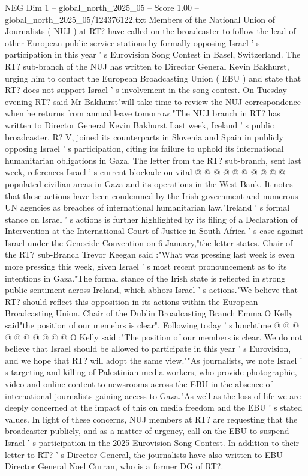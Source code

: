 \begin{textsample}{NEG Dim 1 – global\_north\_2025\_05 – Score 1.00 – global\_north\_2025\_05/124376122.txt}  \label{ex:f1_neg_085}
Members of the National Union of Journalists ( NUJ ) at RT? have called on the broadcaster to follow the lead of other European public service stations by formally opposing Israel ' s participation in this year ' s Eurovision Song Contest in Basel, Switzerland.
The RT? sub-branch of the NUJ has written to Director General Kevin Bakhurst, urging him to contact the European Broadcasting Union ( EBU ) and state that RT? does not support Israel ' s involvement in the song contest.
On Tuesday evening RT? said Mr Bakhurst"will take time to review the NUJ correspondence when he returns from annual leave tomorrow."The NUJ branch in RT? has written to Director General Kevin Bakhurst Last week, Iceland ' s public broadcaster, R?
V, joined its counterparts in Slovenia and Spain in publicly opposing Israel ' s participation, citing its failure to uphold its international humanitarian obligations in Gaza.
The letter from the RT? sub-branch, sent last week, references Israel ' s current blockade on vital @ @ @ @ @ @ @ @ @ @ populated civilian areas in Gaza and its operations in the West Bank.
It notes that these actions have been condemned by the Irish government and numerous UN agencies as breaches of international humanitarian law."Ireland ' s formal stance on Israel ' s actions is further highlighted by its filing of a Declaration of Intervention at the International Court of Justice in South Africa ' s case against Israel under the Genocide Convention on 6 January,"the letter states.
Chair of the RT? sub-Branch Trevor Keegan said :"What was pressing last week is even more pressing this week, given Israel ' s most recent pronouncement as to its intentions in Gaza."The formal stance of the Irish state is reflected in strong public sentiment across Ireland, which abhors Israel ' s actions."We believe that RT? should reflect this opposition in its actions within the European Broadcasting Union.
Chair of the Dublin Broadcasting Branch Emma O Kelly said"the position of our memebrs is clear".
Following today ' s lunchtime @ @ @ @ @ @ @ @ @ @ O Kelly said :"The position of our members is clear.
We do not believe that Israel should be allowed to participate in this year ' s Eurovision, and we hope that RT? will adopt the same view.""As journalists, we note Israel ' s targeting and killing of Palestinian media workers, who provide photographic, video and online content to newsrooms across the EBU in the absence of international journalists gaining access to Gaza."As well as the loss of life we are deeply concerned at the impact of this on media freedom and the EBU ' s stated values.
In light of these concerns, NUJ members at RT? are requesting that the broadcaster publicly, and as a matter of urgency, call on the EBU to suspend Israel ' s participation in the 2025 Eurovision Song Contest.
In addition to their letter to RT? ' s Director General, the journalists have also written to EBU Director General Noel Curran, who is a former DG of RT?.

\end{textsample}

